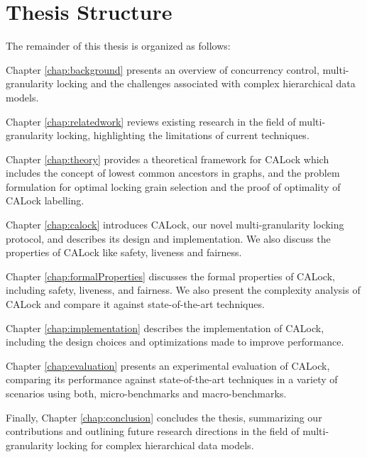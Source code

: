\section{Thesis Structure}
The remainder of this thesis is organized as follows:

 Chapter \ref{chap:background} presents an overview of concurrency control, multi-granularity locking and the challenges associated with complex hierarchical data models. 

 Chapter \ref{chap:relatedwork} reviews existing research in the field of multi-granularity locking, highlighting the limitations of current techniques. 

 Chapter \ref{chap:theory} provides a theoretical framework for CALock which includes the concept of lowest common ancestors in graphs, and the problem formulation for optimal locking grain selection and the proof of optimality of CALock labelling.

 Chapter \ref{chap:calock} introduces CALock, our novel multi-granularity locking protocol, and describes its design and implementation. We also discuss the properties of CALock like safety, liveness and fairness.

Chapter \ref{chap:formalProperties} discusses the formal properties of CALock, including safety, liveness, and fairness. We also present the complexity analysis of CALock and compare it against state-of-the-art techniques.

 Chapter \ref{chap:implementation} describes the implementation of CALock, including the design choices and optimizations made to improve performance.
 
 Chapter \ref{chap:evaluation} presents an experimental evaluation of CALock, comparing its performance against state-of-the-art techniques in a variety of scenarios using both, micro-benchmarks and macro-benchmarks.
 
 Finally, Chapter \ref{chap:conclusion} concludes the thesis, summarizing our contributions and outlining future research directions in the field of multi-granularity locking for complex hierarchical data models.

